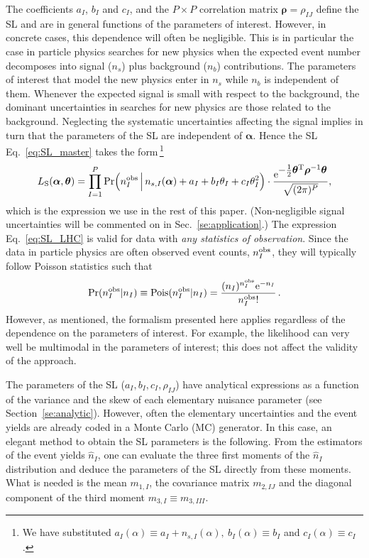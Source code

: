 \documentclass[11pt]{article}
\newcommand{\be}{\begin{equation}}
\newcommand{\ee}{\end{equation}}
\begin{document}
The coefficients $a_I$, $b_I$ and $c_I$, and the $P\times P$ correlation matrix $\bm{\rho}=\rho_{IJ}$ define the SL and are in general functions of the parameters of interest. However, in concrete cases, this dependence will often be negligible. This is in particular the case in particle physics searches for new physics when the expected event number decomposes into signal ($n_s$) plus background ($n_b$) contributions. The parameters of interest that model the new physics enter in $n_s$ while $n_b$ is independent of them.  Whenever the expected signal is small with respect to the background, the dominant uncertainties in searches for new physics are those related to the background.
Neglecting the systematic uncertainties affecting the signal implies in turn that the parameters of the SL are independent of $\bm \alpha$. 
Hence the SL Eq.~\eqref{eq:SL_master} takes the form\,\footnote{We have substituted
$a_I(\alpha) \equiv a_I+n_{s,I}(\alpha),~b_I(\alpha) \equiv b_I$ and $c_I(\alpha)\equiv c_I$.}
\begin{equation}
 L_{\rm{S}}(\bm{\alpha},\bm{\theta})=
\prod_{I=1}^P \mathrm{Pr}\Big( n^{\rm obs}_I \, \Big| \, n_{s,I}(\bm{\alpha})+a_I+ b_I\theta_I+c_I\theta_I^2  \Big) \cdot
\frac{ \mathrm{e}^{ \textstyle-\frac{1}{2}\bm{\theta}^\mathrm{T} \bm{\rho}^{-1} \bm{\theta} }}{\sqrt{(2\pi)^P}},
\label{eq:SL_LHC}
\end{equation}
which is the expression we use in the rest of this paper. 
(Non-negligible signal uncertainties will be commented on in Sec.~\ref{se:application}.)
The expression Eq.~\eqref{eq:SL_LHC} is valid for data with \textit{any statistics of observation}. 
Since the data in particle physics are often observed event counts, $n_{I}^{\rm{obs}}$, they will typically follow Poisson statistics such that
\be
\textrm{Pr}(n^{\rm obs}_{I}|n_{I})\equiv \textrm{Pois}({n}^{\rm{obs}}_{I}|n_{I}) = \dfrac{(n_{I})^{{n}^{\rm{obs}}_{I}} \mathrm{e}^{-n_{I}}}{{n}^{\rm{obs}}_{I}!} \, .
\ee
However, as mentioned, the formalism presented here applies regardless of the dependence on the parameters of interest. For example, the likelihood can very well be multimodal in the parameters of interest; this does not affect the validity of the  approach. 


The parameters of the SL ($a_I, b_I, c_I, \rho_{IJ}$) have analytical expressions
as a function of the variance and the skew  of each elementary nuisance parameter (see Section~\ref{se:analytic}). However, often the elementary uncertainties and the event yields are already coded in a Monte Carlo (MC) generator. In this case, an elegant method to obtain the SL parameters  is the following. From the estimators of the event yields $\hat n_I$, one can evaluate the three first moments of the $\hat n_I$ distribution and deduce the parameters of the SL directly from these moments.
What is needed is the mean $m_{1,I}$, the covariance matrix $m_{2,IJ}$ and the diagonal component of the third moment $m_{3,I} \equiv m_{3,III}$. 
\end{document}
